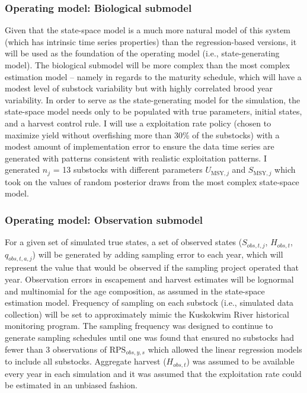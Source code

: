\documentclass[12pt,]{book}
\theoremstyle{definition}
\theoremstyle{definition}
\theoremstyle{definition}
\theoremstyle{remark}
\begin{document}
\subsubsection{Operating model: Biological
submodel}\label{operating-model-biological-submodel}

\noindent
Given that the state-space model is a much more natural model of this
system (which has intrinsic time series properties) than the
regression-based versions, it will be used as the foundation of the
operating model (i.e., state-generating model). The biological submodel
will be more complex than the most complex estimation model -- namely in
regards to the maturity schedule, which will have a modest level of
substock variability but with highly correlated brood year variability.
In order to serve as the state-generating model for the simulation, the
state-space model needs only to be populated with true parameters,
initial states, and a harvest control rule. I will use a exploitation
rate policy (chosen to maximize yield without overfishing more than 30\%
of the substocks) with a modest amount of implementation error to ensure
the data time series are generated with patterns consistent with
realistic exploitation patterns. I generated \(n_j\) = 13 substocks with
different parameters \(U_{\text{MSY},j}\) and \(S_{\text{MSY},j}\) which
took on the values of random posterior draws from the most complex
state-space model.

\subsubsection{Operating model: Observation
submodel}\label{operating-model-observation-submodel}

For a given set of simulated true states, a set of observed states
(\(S_{obs,t,j}\), \(H_{obs,t}\), \(q_{obs,t,a,j}\)) will be generated by
adding sampling error to each year, which will represent the value that
would be observed if the sampling project operated that year.
Observation errors in escapement and harvest estimates will be lognormal
and multinomial for the age composition, as assumed in the state-space
estimation model. Frequency of sampling on each substock (i.e.,
simulated data collection) will be set to approximately mimic the
Kuskokwim River historical monitoring program. The sampling frequency
was designed to continue to generate sampling schedules until one was
found that ensured no substocks had fewer than 3 observations of
\(\text{RPS}_{obs,y,s}\) which allowed the linear regression models to
include all substocks. Aggregate harvest (\(H_{obs,t}\)) was assumed to
be available every year in each simulation and it was assumed that the
exploitation rate could be estimated in an unbiased fashion.
\end{document}
